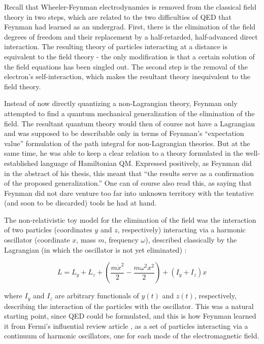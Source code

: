\documentclass[12pt]{article}
\begin{document}
Recall that Wheeler-Feynman electrodynamics is removed from the classical field theory in two steps, which are related to the two difficulties of QED that Feynman had learned as an undergrad. First, there is the elimination of the field degrees of freedom and their replacement by a half-retarded, half-advanced direct interaction. The resulting theory of particles interacting at a distance is equivalent to the field theory - the only modification is that a certain solution of the field equations has been singled out. The second step is the removal of the electron's self-interaction, which makes the resultant theory inequivalent to the field theory.

Instead of now directly quantizing a non-Lagrangian theory, Feynman only attempted to find a quantum mechanical generalization of the elimination of the field. The resultant quantum theory would then of course not have a Lagrangian and was supposed to be describable only in terms of Feynman's ``expectation value'' formulation of the path integral for non-Lagrangian theories. But at the same time, he was able to keep a clear relation to a theory formulated in the well-established language of Hamiltonian QM. Expressed positively, as Feynman did in the abstract of his thesis, this meant that ``the results serve as a confirmation of the proposed generalization.'' One can of course also read this, as saying that Feynman did not dare venture too far into unknown territory with the tentative (and soon to be discarded) tools he had at hand.

The non-relativistic toy model for the elimination of the field was the interaction of two particles (coordinates $y$ and $z$, respectively) interacting via a harmonic oscillator (coordinate $x$, mass $m$, frequency $\omega$), described classically by the Lagrangian (in which the oscillator is not yet eliminated) :

\begin{equation}
L = L_y + L_z + \left(\frac{m \dot{x}^2}{2} - \frac{m \omega^2 x^2}{2} \right) + (I_y + I_z) x
\end{equation}

where $I_y$ and $I_z$ are arbitrary functionals of $y(t)$ and $z(t)$, respectively, describing the interaction of the particles with the oscillator. This was a natural starting point, since QED could be formulated, and this is how Feynman learned it from Fermi's influential review article \citep{fermi_1932_quantum}, as a set of particles interacting via a continuum of harmonic oscillators, one for each mode of the electromagnetic field.
\end{document}
